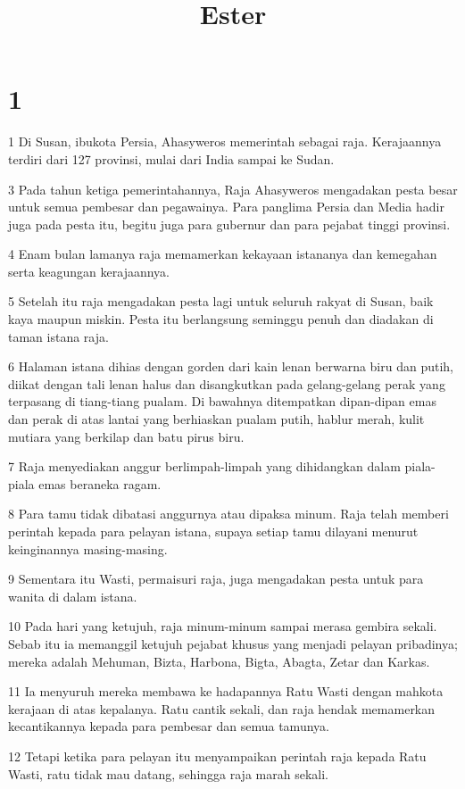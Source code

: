 

\title{Ester}


\chapter{1}

\par 1 Di Susan, ibukota Persia, Ahasyweros memerintah sebagai raja. Kerajaannya terdiri dari 127 provinsi, mulai dari India sampai ke Sudan.
\par 3 Pada tahun ketiga pemerintahannya, Raja Ahasyweros mengadakan pesta besar untuk semua pembesar dan pegawainya. Para panglima Persia dan Media hadir juga pada pesta itu, begitu juga para gubernur dan para pejabat tinggi provinsi.
\par 4 Enam bulan lamanya raja memamerkan kekayaan istananya dan kemegahan serta keagungan kerajaannya.
\par 5 Setelah itu raja mengadakan pesta lagi untuk seluruh rakyat di Susan, baik kaya maupun miskin. Pesta itu berlangsung seminggu penuh dan diadakan di taman istana raja.
\par 6 Halaman istana dihias dengan gorden dari kain lenan berwarna biru dan putih, diikat dengan tali lenan halus dan disangkutkan pada gelang-gelang perak yang terpasang di tiang-tiang pualam. Di bawahnya ditempatkan dipan-dipan emas dan perak di atas lantai yang berhiaskan pualam putih, hablur merah, kulit mutiara yang berkilap dan batu pirus biru.
\par 7 Raja menyediakan anggur berlimpah-limpah yang dihidangkan dalam piala-piala emas beraneka ragam.
\par 8 Para tamu tidak dibatasi anggurnya atau dipaksa minum. Raja telah memberi perintah kepada para pelayan istana, supaya setiap tamu dilayani menurut keinginannya masing-masing.
\par 9 Sementara itu Wasti, permaisuri raja, juga mengadakan pesta untuk para wanita di dalam istana.
\par 10 Pada hari yang ketujuh, raja minum-minum sampai merasa gembira sekali. Sebab itu ia memanggil ketujuh pejabat khusus yang menjadi pelayan pribadinya; mereka adalah Mehuman, Bizta, Harbona, Bigta, Abagta, Zetar dan Karkas.
\par 11 Ia menyuruh mereka membawa ke hadapannya Ratu Wasti dengan mahkota kerajaan di atas kepalanya. Ratu cantik sekali, dan raja hendak memamerkan kecantikannya kepada para pembesar dan semua tamunya.
\par 12 Tetapi ketika para pelayan itu menyampaikan perintah raja kepada Ratu Wasti, ratu tidak mau datang, sehingga raja marah sekali.
